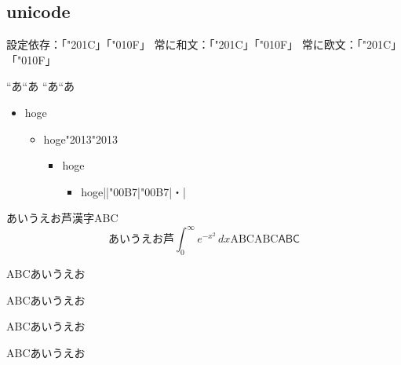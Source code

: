 \documentclass{article}
\begin{document}
\subsection{unicode}

設定依存：「\char"201C」「\char"010F」%
常に和文：「\ltjjachar"201C」「\ltjjachar"010F」%
常に欧文：「\ltjalchar"201C」「\ltjalchar"010F」%

{\tracingall\let\char=\ltjalchar\textquotedblleft}あ\textquotedblleft あ%
{\let\char=\ltjjachar\textquotedblleft}あ“あ

\begin{itemize}
\item hoge
\begin{itemize}
\item hoge\textendash\ltjjachar"2013\ltjalchar"2013
\begin{itemize}
\item hoge
\begin{itemize}
\item hoge|\textperiodcentered|\ltjjachar"00B7|\ltjalchar"00B7|・|
\end{itemize}
\end{itemize}
\end{itemize}
\end{itemize}

あいうえお芦漢字ABC
\[
あいうえお芦\int_0^∞ e^{-x^2}\,dx\mathrm{ABC}\textrm{ABC}\textsf{ABC}
\]

{ABCあいうえお}\par
{ABCあいうえお}\par%
{ABCあいうえお}\par%
{ABCあいうえお}
\end{document}
